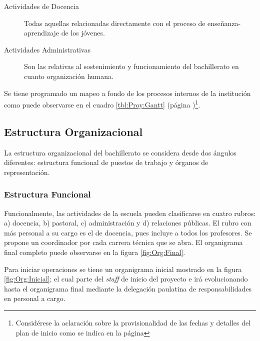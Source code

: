 \begin{description}
	\item[Actividades de Docencia]
		Todas aquellas relacionadas directamente con el proceso de enseñanza-aprendizaje de los jóvenes.
	\item[Actividades Administrativas]
		Son las relativas al sostenimiento y funcionamiento del bachillerato en cuanto organización humana.
\end{description}

Se tiene programado un mapeo a fondo de los procesos internos de la institución como puede observarse en el cuadro \ref{tbl:Proy:Gantt} (página \pageref{tbl:Proy:Gantt})\footnote{Considérese la aclaración sobre la provisionalidad de las fechas y detalles del plan de inicio como se indica en la página \pageref{sec:Proy:Aclaracion}}.


\clearpage

\subsection{Estructura Organizacional}

La estructura organizacional del bachillerato se considera desde dos ángulos diferentes: estructura funcional de puestos de trabajo y órganos de representación.

\subsubsection{Estructura Funcional}

Funcionalmente, las actividades de la escuela pueden clasificarse en cuatro rubros: a) docencia, b) pastoral, c) administración y d) relaciones públicas. El rubro con más personal a su cargo es el de docencia, pues incluye a todos los profesores. Se propone un coordinador por cada carrera técnica que se abra. El organigrama final completo puede observarse en la figura \ref{fig:Org:Final}.


Para iniciar operaciones se tiene un organigrama inicial mostrado en la figura \ref{fig:Org:Inicial}; el cual parte del \emph{staff} de inicio del proyecto e irá evolucionando hasta el organigrama final mediante la delegación paulatina de responsabilidades en personal a cargo.

